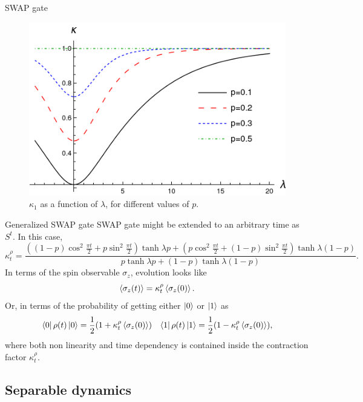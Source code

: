 \begin{frame}{SWAP gate}
    \begin{figure}[h!]
        \centering
        \includegraphics[width=0.6\linewidth]{../notes/log/maxent/figures/ContractionFactorSWAP_2D_lambda0to8.png}
        \caption{$\kappa_{1}$ as a function of $\lambda$, for different values of $p$.}
        \label{fig:SWAPFactor2D}
      \end{figure}
\end{frame}

\begin{frame}{Generalized SWAP gate}
    SWAP gate might be extended to an arbitrary time as $S^{t}$. In this case, 
    \begin{equation*}
        \kappa_{t}^{\rho}=\frac{((1-p)\cos^{2}{\frac{\pi t}{2}}+p\sin^{2}{\frac{\pi t}{2}})\tanh{\lambda p}+(p\cos^{2}{\frac{\pi t}{2}}+(1-p)\sin^{2}{\frac{\pi t}{2}})\tanh{\lambda (1-p)}}{
          p\tanh{\lambda p}+(1-p)\tanh{\lambda (1-p)}}.
      \end{equation*}
      In terms of the spin observable $\sigma_{z}$, evolution looks like
\begin{equation}
  \expval{\sigma_{z}(t)}=\kappa_{t}^{\rho}\expval{\sigma_{z}(0)}.
\end{equation}
Or, in terms of the probability of getting either $\ket{0}$ or $\ket{1}$ as
 \begin{align}
  \bra{0}\rho(t)\ket{0}=\frac{1}{2}(1+\kappa_{t}^{\rho}\expval{\sigma_{z}(0)}) && \bra{1}\rho(t)\ket{1}=\frac{1}{2}(1-\kappa_{t}^{\rho}\expval{\sigma_{z}(0)}),
 \end{align}
 where both non linearity and time dependency is contained inside the contraction factor $\kappa_{t}^{\rho}$. 
\end{frame}

\subsection{Separable dynamics}

